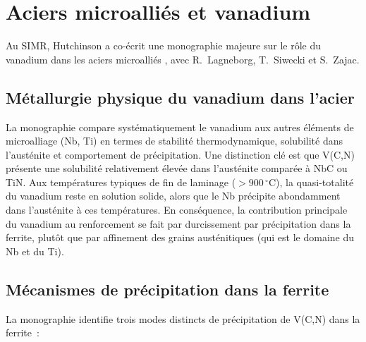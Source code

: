 \documentclass[11pt,a4paper]{article}
\begin{document}
\section{Aciers microalli\'es et vanadium}
\label{sec:microalloy}

Au SIMR, Hutchinson a co-\'ecrit une monographie majeure sur le r\^ole
du vanadium dans les aciers microalli\'es \cite{Lagneborg2014}, avec
R.~Lagneborg, T.~Siwecki et S.~Zajac.

\subsection{M\'etallurgie physique du vanadium dans l'acier}

La monographie compare syst\'ematiquement le vanadium aux autres
\'el\'ements de microalliage (Nb, Ti) en termes de stabilit\'e
thermodynamique, solubilit\'e dans l'aust\'enite et comportement de
pr\'ecipitation.  Une distinction cl\'e est que V(C,N) pr\'esente une
solubilit\'e relativement \'elev\'ee dans l'aust\'enite compar\'ee \`a
NbC ou TiN.  Aux temp\'eratures typiques de fin de laminage
($>900\,{}^\circ$C), la quasi-totalit\'e du vanadium reste en solution
solide, alors que le Nb pr\'ecipite abondamment dans l'aust\'enite \`a
ces temp\'eratures.  En cons\'equence, la contribution principale du
vanadium au renforcement se fait par durcissement par pr\'ecipitation
dans la ferrite, plut\^ot que par affinement des grains
aust\'enitiques (qui est le domaine du Nb et du Ti).

\subsection{M\'ecanismes de pr\'ecipitation dans la ferrite}

La monographie identifie trois modes distincts de pr\'ecipitation de
V(C,N) dans la ferrite~:
\end{document}
